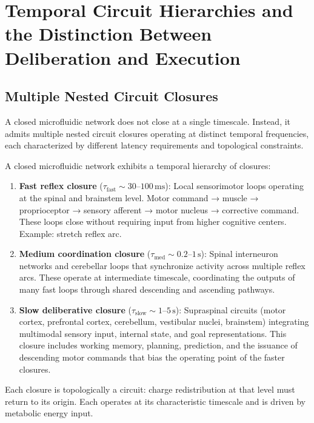\section{Temporal Circuit Hierarchies and the Distinction Between Deliberation and Execution}
\label{sec:temporal-hierarchies}

\subsection{Multiple Nested Circuit Closures}

A closed microfluidic network does not close at a single timescale. Instead, it admits multiple nested circuit closures operating at distinct temporal frequencies, each characterized by different latency requirements and topological constraints.

\begin{definition}
\label{def:temporal-hierarchy}
A closed microfluidic network exhibits a temporal hierarchy of closures:

\begin{enumerate}[label=(\roman*),leftmargin=*,itemsep=2pt]

\item \textbf{Fast reflex closure} ($\tau_{\text{fast}} \sim 30\text{--}100\,\text{ms}$):
Local sensorimotor loops operating at the spinal and brainstem level. Motor command → muscle → proprioceptor → sensory afferent → motor nucleus → corrective command. These loops close without requiring input from higher cognitive centers. Example: stretch reflex arc.

\item \textbf{Medium coordination closure} ($\tau_{\text{med}} \sim 0.2\text{--}1\,\text{s}$):
Spinal interneuron networks and cerebellar loops that synchronize activity across multiple reflex arcs. These operate at intermediate timescale, coordinating the outputs of many fast loops through shared descending and ascending pathways.

\item \textbf{Slow deliberative closure} ($\tau_{\text{slow}} \sim 1\text{--}5\,\text{s}$):
Supraspinal circuits (motor cortex, prefrontal cortex, cerebellum, vestibular nuclei, brainstem) integrating multimodal sensory input, internal state, and goal representations. This closure includes working memory, planning, prediction, and the issuance of descending motor commands that bias the operating point of the faster closures.

\end{enumerate}

Each closure is topologically a circuit: charge redistribution at that level must return to its origin. Each operates at its characteristic timescale and is driven by metabolic energy input.
\end{definition}

